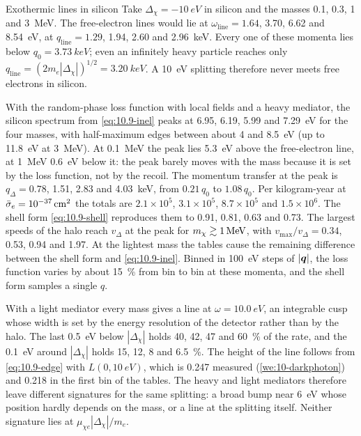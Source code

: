\begin{workedexample}{Exothermic lines in silicon}\label{we:10-exo}
Take $\Delta_\chi = \SI{-10}{eV}$ in silicon and the masses 0.1, 0.3, 1 and \SI{3}{MeV}. The free-electron lines would lie at $\omega_{\mathrm{line}} = 1.64$, 3.70, 6.62 and \SI{8.54}{eV}, at $q_{\mathrm{line}} = 1.29$, 1.94, 2.60 and \SI{2.96}{keV}. Every one of these momenta lies below $q_0 = \SI{3.73}{keV}$; even an infinitely heavy particle reaches only $q_{\mathrm{line}} = (2m_e|\Delta_\chi|)^{1/2} = \SI{3.20}{keV}$. A \SI{10}{eV} splitting therefore never meets free electrons in silicon.

With the random-phase loss function with local fields and a heavy mediator, the silicon spectrum from \cref{eq:10.9-inel} peaks at 6.95, 6.19, 5.99 and \SI{7.29}{eV} for the four masses, with half-maximum edges between about 4 and \SI{8.5}{eV} (up to \SI{11.8}{eV} at \SI{3}{MeV}). At \SI{0.1}{MeV} the peak lies \SI{5.3}{eV} above the free-electron line, at \SI{1}{MeV} \SI{0.6}{eV} below it: the peak barely moves with the mass because it is set by the loss function, not by the recoil. The momentum transfer at the peak is $q_\Delta = 0.78$, 1.51, 2.83 and \SI{4.03}{keV}, from $0.21\,q_0$ to $1.08\,q_0$. Per kilogram-year at $\bar{\sigma}_{e} = \SI{e-37}{cm^2}$ the totals are $2.1\times10^5$, $3.1\times10^5$, $8.7\times10^5$ and $1.5\times10^6$. The shell form \cref{eq:10.9-shell} reproduces them to 0.91, 0.81, 0.63 and 0.73. The largest speeds of the halo reach $v_\Delta$ at the peak for $m_{\chi} \gtrsim \SI{1}{MeV}$, with $v_{\mathrm{max}}/v_\Delta = 0.34$, 0.53, 0.94 and 1.97. At the lightest mass the tables cause the remaining difference between the shell form and \cref{eq:10.9-inel}. Binned in \SI{100}{eV} steps of $|\bm{q}|$, the loss function varies by about \SI{15}{\percent} from bin to bin at these momenta, and the shell form samples a single $q$.

With a light mediator every mass gives a line at $\omega = \SI{10.0}{eV}$, an integrable cusp whose width is set by the energy resolution of the detector rather than by the halo. The last \SI{0.5}{eV} below $|\Delta_\chi|$ holds 40, 42, 47 and \SI{60}{\percent} of the rate, and the \SI{0.1}{eV} around $|\Delta_\chi|$ holds 15, 12, 8 and \SI{6.5}{\percent}. The height of the line follows from \cref{eq:10.9-edge} with $L(0,\SI{10}{eV})$, which is 0.247 measured (\cref{we:10-darkphoton}) and 0.218 in the first bin of the tables. The heavy and light mediators therefore leave different signatures for the same splitting: a broad bump near \SI{6}{eV} whose position hardly depends on the mass, or a line at the splitting itself. Neither signature lies at $\mu_{\chi e}|\Delta_\chi|/m_e$.
\end{workedexample}

